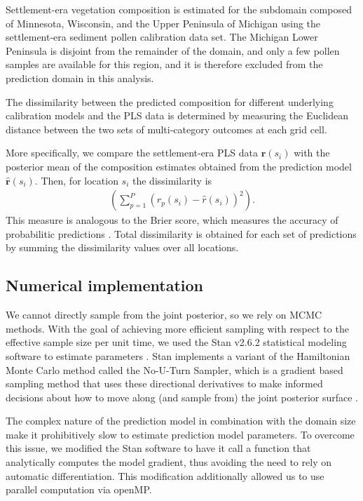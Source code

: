 \documentclass[12pt]{article}
\begin{document}
Settlement-era vegetation composition is estimated for the subdomain
composed of Minnesota, Wisconsin, and the Upper Peninsula of Michigan
using the settlement-era sediment pollen calibration data set. The
Michigan Lower Peninsula is disjoint from the remainder of the domain,
and only a few pollen samples are available for this region, and it is
therefore excluded from the prediction domain in this analysis.

The dissimilarity between the predicted composition for different
underlying calibration models and the PLS data is determined by
measuring the Euclidean distance between the two sets of
multi-category outcomes at each grid cell.

More specifically, we compare the settlement-era PLS data
$\bm{r}(s_i)$ with the posterior mean of the composition estimates
obtained from the prediction model $\hat{\bm{r}}(s_i)$. Then, for
location $s_i$ the dissimilarity is
\begin{align*}
\left( \sum_{p=1}^{P} (r_p(s_i) - \hat{r}(s_i))^2 \right).
\end{align*}
This measure is analogous to the Brier score, which measures the
accuracy of probabilitic predictions
\citep{gneiting2007strictly}. Total dissimilarity is obtained for each
set of predictions by summing the dissimilarity values over all
locations.

\subsection{Numerical implementation}
\label{sec:imp}

We cannot directly sample from the joint posterior, so we rely on MCMC
methods. With the goal of achieving more efficient sampling with
respect to the effective sample size per unit time, we used the Stan
v2.6.2 statistical modeling software to estimate parameters
\citep{stan-software:2014}. Stan implements a variant of the
Hamiltonian Monte Carlo method called the No-U-Turn Sampler, which is
a gradient based sampling method that uses these directional
derivatives to make informed decisions about how to move along (and
sample from) the joint posterior surface \citep{hoffman2011nuts}.

The complex nature of the prediction model in combination with the
domain size make it prohibitively slow to estimate prediction model
parameters. To overcome this issue, we modified the Stan software to
have it call a function that analytically computes the model gradient,
thus avoiding the need to rely on automatic differentiation. This
modification additionally allowed us to use parallel computation via
openMP.
\end{document}

